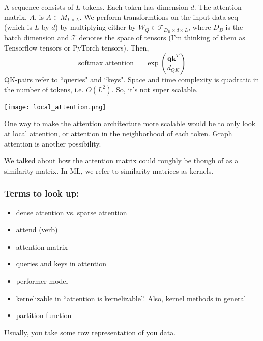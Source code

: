 A sequence consists of $L$ tokens. Each token has dimension $d$. The attention matrix, $A$, is $A\in M_{L\times L }$. We perform transformtions on the input data seq (which is $L$ by $d$) by multiplying either by $W_Q \in \mathcal{T}_{D_B \times d \times L}$, where $D_B$ is the batch dimension and $\mathcal{T}$ denotes the space of tensors (I'm thinking of them as Tensorflow tensors or PyTorch tensors). Then,
\[ \text{softmax attention } 
	= \exp\left( \frac{\bm{q}\bm{k}^T}{ d_{QK}} \right) \]
QK-pairs refer to ``queries" and ``keys".  Space and time complexity is quadratic in the number of tokens, i.e. $O(L^2)$. So, it's not super scalable. 

\texttt{[image: local\_attention.png]}

One way to make the attention architecture more scalable would be to only look at local attention, or attention in the neighborhood of each token. Graph attention is another possibility. 	

We talked about how the  attention matrix could roughly be though of as a similarity matrix. In ML, we refer to similarity matrices as kernels. 


\subsubsection*{Terms to look up:}
\begin{itemize}
	\item dense attention vs. sparse attention
	\item attend (verb)
	\item attention matrix
	\item queries and keys in attention
	\item performer model
	\item kernelizable in ``attention is kernelizable''. Also, \href{https://en.wikipedia.org/wiki/Kernel_method}{kernel methods} in general
	\item partition function 
\end{itemize}


Usually, you take some row representation of you data.